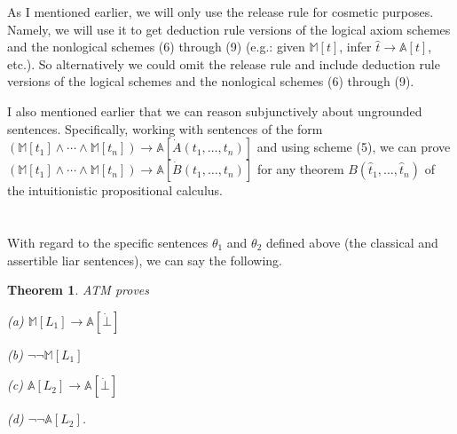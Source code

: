 \documentclass{amsart}
\newtheorem{theorem}{Theorem}[section]
\theoremstyle{definition}
\begin{document}
As I mentioned earlier, we will only use the release rule for cosmetic purposes. Namely, we will use it to get deduction rule versions of the logical axiom schemes and the nonlogical schemes (6) through (9) (e.g.: given $\mathbb{M}[t]$, infer $\hat{t} \to \mathbb{A}[t]$, etc.). So alternatively we could omit the release rule and include deduction rule versions of the logical schemes and the nonlogical schemes (6) through (9).

I also mentioned earlier that we can reason subjunctively about ungrounded sentences. Specifically, working with sentences of the form $(\mathbb{M}[t_1] \wedge \cdots \wedge \mathbb{M}[t_n]) \to \mathbb{A}[\dot{A}(t_1, \ldots, t_n)]$ and using scheme (5), we can prove $(\mathbb{M}[t_1] \wedge \cdots \wedge \mathbb{M}[t_n]) \to \mathbb{A}[\dot{B}(t_1, \ldots, t_n)]$ for any theorem $B(\hat{t}_1, \ldots, \hat{t}_n)$ of the intuitionistic propositional calculus.

\section{}

With regard to the specific sentences $\theta_1$ and $\theta_2$ defined above (the classical and assertible liar sentences), we can say the following.

\begin{theorem}\label{lp}
  ATM proves

  (a) $\mathbb{M}[L_1] \to \mathbb{A}[\dot{\bot}]$

  (b) $\neg\neg\mathbb{M}[L_1]$

  (c) $\mathbb{A}[L_2] \to \mathbb{A}[\dot{\bot}]$

  (d) $\neg\neg\mathbb{A}[L_2]$.
\end{theorem}
\end{document}
